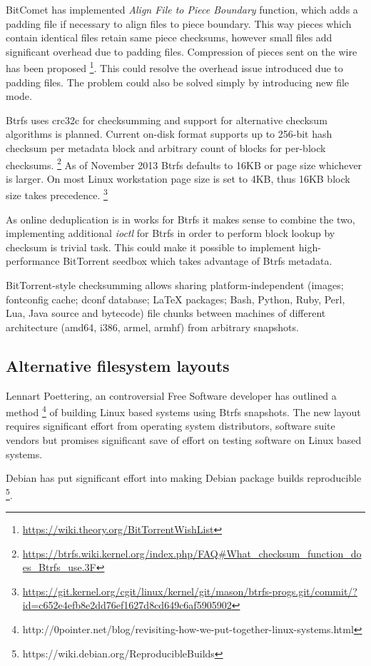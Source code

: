 \documentclass{article}
\begin{document}
BitComet has implemented \emph{Align File to Piece Boundary} function,
which adds a padding file if necessary to align files to piece boundary.
This way pieces which contain identical files retain same piece checksums,
however small files add significant overhead due to padding files.
Compression of pieces sent on the wire has been proposed
\footnote{\url{https://wiki.theory.org/BitTorrentWishList}}.
This could resolve the overhead issue introduced due to padding files.
The problem could also be solved simply by introducing new file mode.

Btrfs uses crc32c for checksumming and support for alternative checksum algorithms is planned.
Current on-disk format supports up to 256-bit hash checksum per
metadata block and arbitrary count of blocks for per-block checksums.
\footnote{\url{https://btrfs.wiki.kernel.org/index.php/FAQ#What_checksum_function_does_Btrfs_use.3F}}
As of November 2013 Btrfs defaults to 16KB or page size whichever
is larger.
On most Linux workstation page size is set to 4KB, thus 16KB block
size takes precedence.
\footnote{\url{https://git.kernel.org/cgit/linux/kernel/git/mason/btrfs-progs.git/commit/?id=c652e4efb8e2dd76ef1627d8cd649c6af5905902}}

As online deduplication is in works for Btrfs it makes sense to combine the two,
implementing additional \emph{ioctl} for Btrfs in order to perform block lookup
by checksum is trivial task.
This could make it possible to implement high-performance BitTorrent seedbox
which takes advantage of Btrfs metadata.

BitTorrent-style checksumming allows sharing platform-independent
(images; fontconfig cache; dconf database; LaTeX packages;
Bash, Python, Ruby, Perl, Lua, Java source and bytecode)
file chunks between machines of different architecture (amd64, i386, armel, armhf)
from arbitrary snapshots.

\subsection{Alternative filesystem layouts}

Lennart Poettering, an controversial Free Software developer has outlined a method
\footnote{http://0pointer.net/blog/revisiting-how-we-put-together-linux-systems.html}
of building Linux based systems using Btrfs snapshots.
The new layout requires significant effort from operating system distributors,
software suite vendors but promises significant save of effort on testing
software on Linux based systems.

Debian has put significant effort into making Debian package builds reproducible
\footnote{https://wiki.debian.org/ReproducibleBuilds}.





\end{document}
